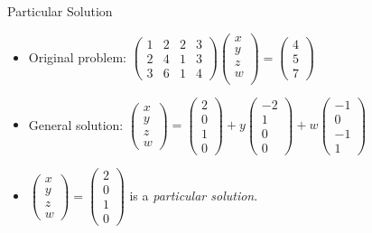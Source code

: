 \documentclass{beamer}
\begin{document}
\begin{frame}{Particular Solution}

\begin{itemize}
\item
Original problem: $
\begin{pmatrix}
1 & 2 & 2 & 3 \\
2 & 4 & 1 & 3 \\
3 & 6 & 1 & 4
\end{pmatrix}
\begin{pmatrix}
x \\
y \\
z \\
w \\
\end{pmatrix}
=
\begin{pmatrix}
4 \\
5 \\
7
\end{pmatrix}
$
\item
General solution: $
\begin{pmatrix}
x \\ y \\ z \\ w
\end{pmatrix}
=
\begin{pmatrix}
2 \\
0 \\
1 \\
0
\end{pmatrix}
+
y
\begin{pmatrix}
-2 \\
1 \\
0 \\
0
\end{pmatrix}
+
w
\begin{pmatrix}
-1 \\
0 \\
-1 \\
1
\end{pmatrix}
$
\item
$
\begin{pmatrix}
x \\ y \\ z \\ w
\end{pmatrix}
=
\begin{pmatrix}
2 \\
0 \\
1 \\
0
\end{pmatrix}
$
is a \emph{particular solution}.

\end{itemize}
\end{frame}
\end{document}
